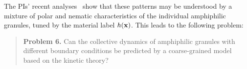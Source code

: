%
The PIs' recent analyses~\cite{fu-ryh-qua-you2022} show that these
patterns may be understood by a mixture of polar and nematic
characteristics of the individual amphiphilic granules, tuned by the
material label $h({\mathbf{x}})$. This leads to the following problem:
%
\begin{quotation}
  \noindent
  \textbf{Problem 6.} Can the collective dynamics of amphiphilic granules with different boundary conditions 
be predicted by a coarse-grained model based on the kinetic theory?
\end{quotation}
%
